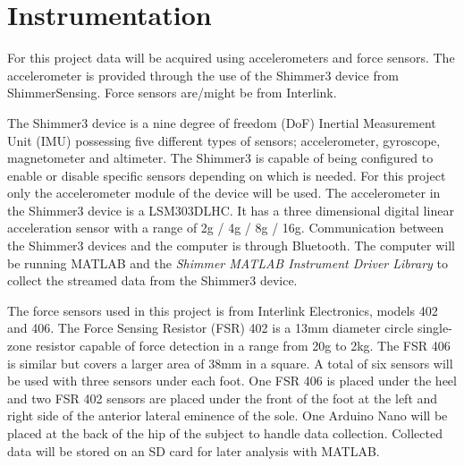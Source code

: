 \section{Instrumentation}

For this project data will be acquired using accelerometers and force sensors. The accelerometer is provided through the use of the Shimmer3 device from ShimmerSensing. Force sensors are/might be from Interlink. %

The Shimmer3 device is a nine degree of freedom (DoF) Inertial Measurement Unit (IMU) possessing five different types of sensors; accelerometer, gyroscope, magnetometer and altimeter. The Shimmer3 is capable of being configured to enable or disable specific sensors depending on which is needed. For this project only the accelerometer module of the device will be used. The accelerometer in the Shimmer3 device is a LSM303DLHC. It has a three dimensional digital linear acceleration sensor with a range of \pm2g / \pm4g / \pm8g / \pm16g. \cite{LSM303DLHC} %
Communication between the Shimmer3 devices and the computer is through Bluetooth. The computer will be running MATLAB and the \textit{Shimmer MATLAB Instrument Driver Library} to collect the streamed data from the Shimmer3 device. 

The force sensors used in this project is from Interlink Electronics, models 402 and 406. The Force Sensing Resistor (FSR) 402 is a 13mm diameter circle single-zone resistor capable of force detection in a range from 20g to 2kg. The FSR 406 is similar but covers a larger area of 38mm in a square. \cite{IE400}
A total of six sensors will be used with three sensors under each foot. One FSR 406 is placed under the heel and two FSR 402 sensors are placed under the front of the foot at the left and right side of the anterior lateral eminence of the sole. One Arduino Nano will be placed at the back of the hip of the subject to handle data collection. Collected data will be stored on an SD card for later analysis with MATLAB. 
